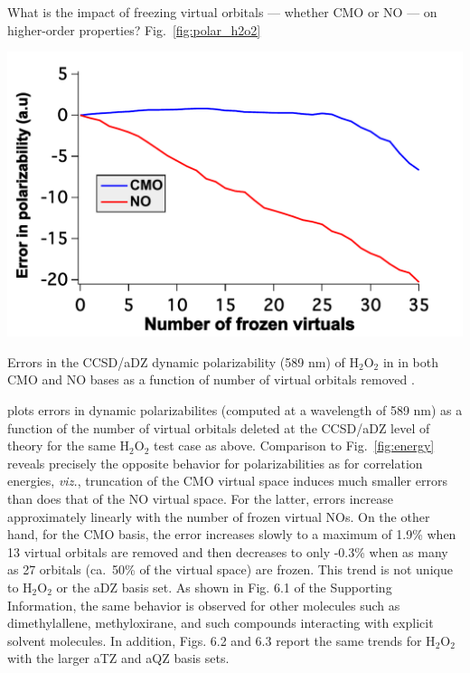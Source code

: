What is the impact of freezing virtual orbitals --- whether CMO or NO --- on
higher-order properties?  Fig.~\ref{fig:polar_h2o2} 
\begin{MyFigure}[h!]
\centering
\includegraphics[width=0.6\linewidth]{figures_fvno/h2o2_polar.pdf}
\caption{{\footnotesize Errors in the CCSD/aDZ dynamic polarizability (589 nm) of H$_2$O$_2$ in
       in both CMO and NO bases as a function of number of virtual orbitals removed .}}
\label{fig:polar_h2o2}
\end{MyFigure}
plots errors in dynamic polarizabilites (computed at a wavelength of 589 nm) as a function of the
number of virtual orbitals deleted at the CCSD/aDZ level of theory for the
same H$_2$O$_2$ test case as above.  Comparison to Fig.\ \ref{fig:energy}
reveals precisely the opposite behavior for polarizabilities as for
correlation energies, {\em viz.}, truncation of the CMO virtual space induces
much smaller errors than does that of the NO virtual space.  For the latter,
errors increase approximately linearly with the number of frozen virtual NOs.
On the other hand, for the CMO basis, the error increases slowly to a maximum
of 1.9\% when 13 virtual orbitals are removed and then decreases to only
-0.3\% when as many as 27 orbitals (ca.\ 50\% of the virtual space) are
frozen.  This trend is not unique to H$_2$O$_2$ or the aDZ basis set. As shown
in Fig. 6.1 of the Supporting Information, the same behavior is observed for
other molecules such as dimethylallene, methyloxirane, and such compounds
interacting with explicit solvent molecules.  In addition, Figs. 6.2 and 6.3
report the same trends for H$_2$O$_2$ with the larger aTZ and aQZ basis sets.



